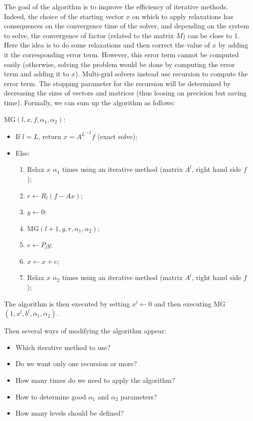 \documentclass[sigplan]{acmart}
\begin{document}
  The goal of the algorithm is to improve the efficiency of iterative methods. Indeed, the choice of the starting vector $x$ on which to apply relaxations has consequences on the convergence
  time of the solver, and depending on the system to solve, the convergence of factor (related to the matrix $M$) can be close to 1.\\
  Here the idea is to do some relaxations and then correct the value of $x$ by adding it the corresponding error term. However, this error term cannot be computed easily (otherwise,
  solving the problem would be done by computing the error term and adding it to $x$). Multi-grid solvers instead use recursion to compute the error term. The stopping parameter for the
  recursion will be determined by decreasing the sizes of vectors and matrices (thus loosing on precision but saving time).
  Formally, we can sum up the algorithm as follows:
  
  MG$(l,x,f,\alpha_1,\alpha_2)$:
  \begin{itemize}
    \item If $l = L$, return $x = {A^L}^{-1} f$ (exact solve);
    \item Else:
    \begin{enumerate}
      \item Relax $x$ $\alpha_1$ times using an iterative method (matrix $A^l$, right hand side $f$);
      \item $r \leftarrow R_l ( f - Ax )$;
      \item $y \leftarrow 0$:
      \item MG$(l+1,y,r,\alpha_1,\alpha_2)$;
      \item $e \leftarrow P_{l} y$;
      \item $x \leftarrow x+e$;
      \item Relax $x$ $\alpha_2$ times using an iterative method (matrix $A^l$, right hand side $f$);
   \end{enumerate}
  \end{itemize}
  The algorithm is then executed by setting $x^l \leftarrow 0$ and then executing MG$(1,x^l,b^l,\alpha_1,\alpha_2)$.

  Then several ways of modifying the algorithm appear:
  \begin{itemize}
   \item Which iterative method to use?
   \item Do we want only one recursion or more?
   \item How many times do we need to apply the algorithm?
   \item How to determine good $\alpha_1$ and $\alpha_2$ parameters?
   \item How many levels should be defined?
  \end{itemize}
\end{document}

